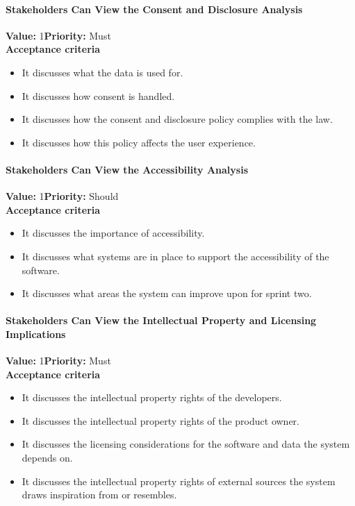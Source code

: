 \paragraph{Stakeholders Can View the Consent and Disclosure Analysis}
\textbf{Value:} 1\quad \textbf{Priority:} Must\\
\textbf{Acceptance criteria}
\begin{itemize}
  \item It discusses what the data is used for.
  \item It discusses how consent is handled.
  \item It discusses how the consent and disclosure policy complies with the law.
  \item It discusses how this policy affects the user experience.
\end{itemize}

\paragraph{Stakeholders Can View the Accessibility Analysis}
\textbf{Value:} 1\quad \textbf{Priority:} Should\\
\textbf{Acceptance criteria}
\begin{itemize}
  \item It discusses the importance of accessibility.
  \item It discusses what systems are in place to support the accessibility of the software.
  \item It discusses what areas the system can improve upon for sprint two.
\end{itemize}

\paragraph{Stakeholders Can View the Intellectual Property and Licensing Implications}
\textbf{Value:} 1\quad \textbf{Priority:} Must\\
\textbf{Acceptance criteria}
\begin{itemize}
  \item It discusses the intellectual property rights of the developers.
  \item It discusses the intellectual property rights of the product owner.
  \item It discusses the licensing considerations for the software and data the system depends on.
  \item It discusses the intellectual property rights of external sources the system draws inspiration from or resembles.
\end{itemize}

